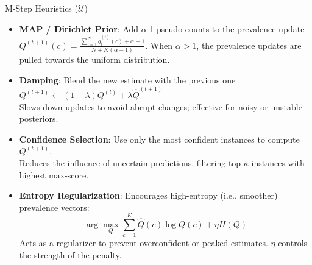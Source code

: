 \documentclass[aspectratio=169]{beamer}
\begin{document}
\begin{frame}{M‑Step Heuristics ($\mathcal{U}$)}
  \begin{itemize}
    \item \textbf{MAP / Dirichlet Prior}: Add $\alpha$-1 pseudo-counts to the prevalence update $Q^{(t+1)}(c) = \frac{\sum_{i=1}^N \tilde{q}_i^{(t)}(c) + \alpha - 1}{N + K(\alpha - 1)}$.
    When $\alpha>1$, the prevalence updates are pulled towards the uniform distribution. 

    \item \textbf{Damping}: Blend the new estimate with the previous one $Q^{(t+1)} \gets (1-\lambda) Q^{(t)} + \lambda \hat{Q}^{(t+1)}$   \\
    
    \small Slows down updates to avoid abrupt changes; effective for noisy or unstable posteriors.
    \normalsize

    \item \textbf{Confidence Selection}: Use only the most confident instances to compute $Q^{(t+1)}$.\\
    \small Reduces the influence of uncertain predictions, filtering top-$\kappa$ instances with highest max-score.
    \normalsize

    \item \textbf{Entropy Regularization}: Encourages high-entropy (i.e., smoother) prevalence vectors:\\
    \[
        \arg\max_Q \sum_{c=1}^K \hat{Q}(c) \log Q(c) + \eta H(Q)
    \]
    \small Acts as a regularizer to prevent overconfident or peaked estimates. $\eta$ controls the strength of the penalty.
  \end{itemize}
\end{frame}
\end{document}

